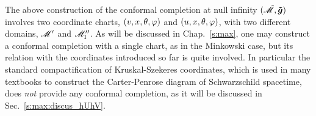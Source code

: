 \begin{remark}
The above construction of the conformal completion at null infinity
$(\tilde{\mathscr{M}},\bm{\tilde{g}})$ involves two coordinate charts,
$(v,x,\theta,\varphi)$ and $(u,x,\theta,\varphi)$, with two different
domains, $\mathscr{M}'$ and $\mathscr{M}''_{\rm I}$.
As will be discussed in Chap.~\ref{s:max},
one may construct a conformal completion
with a single chart, as in the Minkowski case, but its relation with
the coordinates introduced so far is quite involved.
In particular the standard compactification of Kruskal-Szekeres coordinates,
which is used in many textbooks to construct the Carter-Penrose diagram
of Schwarzschild spacetime, does \emph{not} provide any
conformal completion, as it will be discussed in
Sec.~\ref{s:max:discus_hUhV}.
\end{remark}



